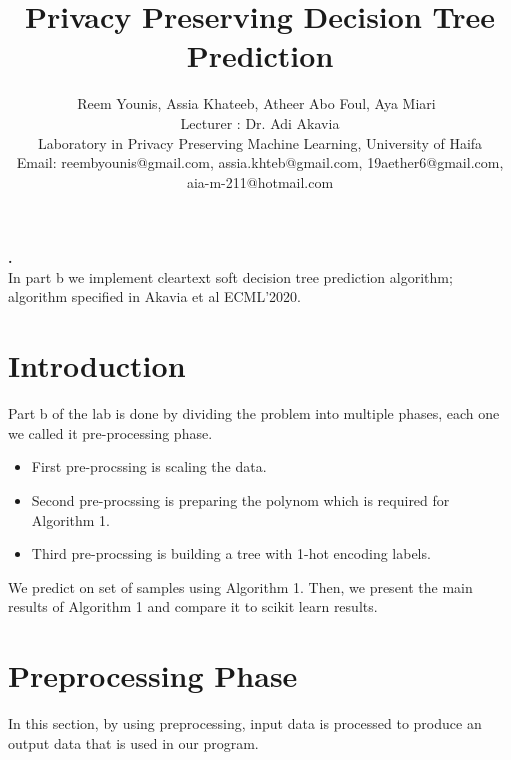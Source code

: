 \documentclass{article}
\renewenvironment{abstract}
 {\par\noindent\textbf{\abstractname.}\ \ignorespaces}
 {\par\medskip}
\begin{document}
\title{Privacy Preserving Decision Tree Prediction}


\author{Reem Younis, Assia Khateeb, Atheer Abo Foul, Aya Miari\
\\
Lecturer : Dr. Adi Akavia
\\Laboratory in Privacy Preserving Machine Learning, 
University of Haifa\\
Email: reembyounis@gmail.com, assia.khteb@gmail.com, 19aether6@gmail.com, aia-m-211@hotmail.com

}
\maketitle
\tableofcontents

\newpage

\begin{abstract}
\\In  part b we implement cleartext soft decision tree prediction algorithm; algorithm specified in Akavia et al ECML’2020. 
\end{abstract}


\section{Introduction}
Part b of the lab is done by dividing the problem into multiple phases, each one we called it pre-processing phase.
\begin{itemize}
\item First pre-procssing is scaling the data.
\item Second pre-procssing is preparing the polynom which is required for Algorithm 1.
\item Third pre-procssing is building a tree with 1-hot encoding labels.
\end{itemize}
We predict on set of samples using Algorithm 1.
Then, we present the main results of Algorithm 1 and compare it to scikit learn results.\\


\section{Preprocessing Phase}
In this section, by using preprocessing, input data is processed to produce an output data that is used in our program.
\end{document}

